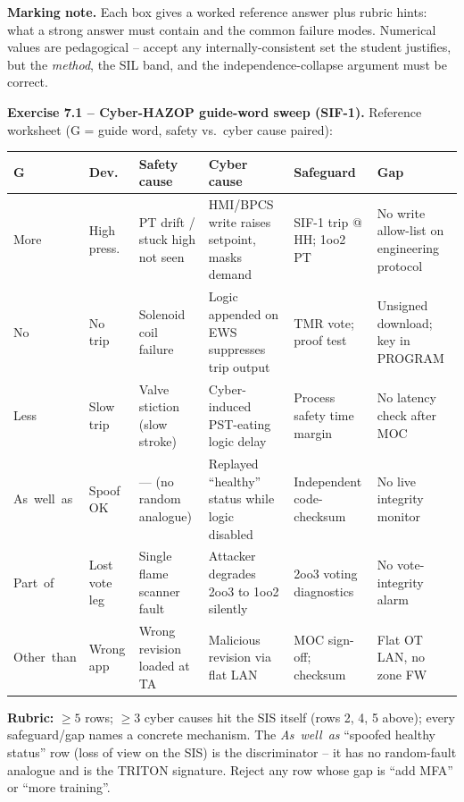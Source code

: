 \documentclass[11pt,a4paper]{article}
\begin{document}
\sheetheader

\noindent\textbf{Marking note.} Each box gives a worked reference answer plus
rubric hints: what a strong answer must contain and the common failure modes.
Numerical values are pedagogical -- accept any internally-consistent set the
student justifies, but the \emph{method}, the SIL band, and the
independence-collapse argument must be correct.

\vspace{0.6em}

\begin{solutionbox}
\textbf{Exercise 7.1 -- Cyber-HAZOP guide-word sweep (SIF-1).}
Reference worksheet (G = guide word, safety vs.\ cyber cause paired):

\smallskip
\renewcommand{\arraystretch}{1.25}
\footnotesize
\setlength{\tabcolsep}{3pt}
\noindent\par\begin{tabular}{@{}p{1.6cm}p{1.5cm}p{2.7cm}p{2.7cm}p{2.5cm}p{2.3cm}@{}}
\toprule
\textbf{G} & \textbf{Dev.} & \textbf{Safety cause} & \textbf{Cyber cause} & \textbf{Safeguard} & \textbf{Gap} \\
\midrule
More & High press. & PT drift / stuck high not seen & HMI/BPCS write raises setpoint, masks demand & SIF-1 trip @ HH; 1oo2 PT & No write allow-list on engineering protocol \\
No & No trip & Solenoid coil failure & Logic appended on EWS suppresses trip output & TMR vote; proof test & Unsigned download; key in PROGRAM \\
Less & Slow trip & Valve stiction (slow stroke) & Cyber-induced PST-eating logic delay & Process safety time margin & No latency check after MOC \\
As~well~as & Spoof OK & --- (no random analogue) & Replayed ``healthy'' status while logic disabled & Independent code-checksum & No live integrity monitor \\
Part~of & Lost vote leg & Single flame scanner fault & Attacker degrades 2oo3 to 1oo2 silently & 2oo3 voting diagnostics & No vote-integrity alarm \\
Other~than & Wrong app & Wrong revision loaded at TA & Malicious revision via flat LAN & MOC sign-off; checksum & Flat OT LAN, no zone FW \\
\bottomrule
\end{tabular}

\smallskip
\textbf{Rubric:} $\geq 5$ rows; $\geq 3$ cyber causes hit the SIS itself
(rows 2, 4, 5 above); every safeguard/gap names a concrete mechanism. The
\emph{As~well~as} ``spoofed healthy status'' row (loss of view on the SIS) is
the discriminator -- it has no random-fault analogue and is the TRITON
signature. Reject any row whose gap is ``add MFA'' or ``more training''.
\end{solutionbox}
\end{document}
